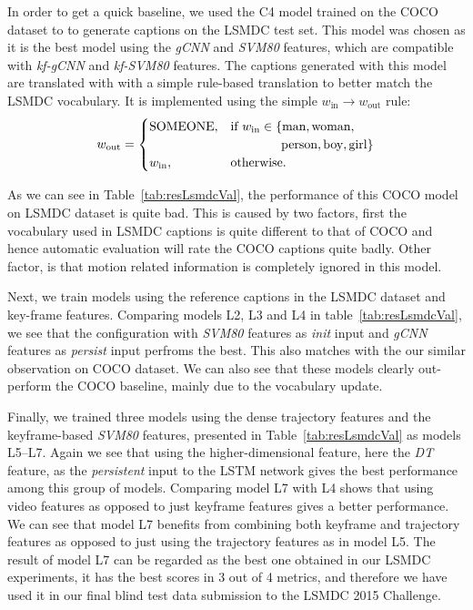 In order to get a quick baseline, we used the C4 model trained on the COCO
dataset to to generate captions on the LSMDC test set.
This model was chosen as it is the best model using the \emph{gCNN} and
\emph{SVM80} features, which are compatible with \emph{kf-gCNN} and
\emph{kf-SVM80} features.
The captions generated with this model are translated with with a simple
rule-based translation to better match the LSMDC vocabulary.
It is implemented using the simple%
$w_{\text{in}} \longrightarrow w_{\text{out}}$ rule:
\begin{align} \label{eqTrans} w_{\text{out}} = \begin{cases} \text{SOMEONE},&
\text{if } w_{\text{in}} \in \{\text{man}, \text{woman}, \\&
\text{\mbox{\qquad\qquad person}}, \text{boy}, \text{girl} \}\\ w_{\text{in}},&
\text{otherwise.} \end{cases} \end{align}

As we can see in Table~\ref{tab:resLsmdcVal}, the performance of this COCO model
on LSMDC dataset is quite bad.
This is caused by two factors, first the vocabulary used in LSMDC captions is
quite different to that of COCO and hence automatic evaluation will rate the
COCO captions quite badly.
Other factor, is that motion related information is completely ignored in this
model.

Next, we train models using the reference captions in the LSMDC dataset and
key-frame features.
Comparing models L2, L3 and L4 in table~\ref{tab:resLsmdcVal}, we see that the
configuration with \emph{SVM80} features as \emph{init} input and \emph{gCNN}
features as \emph{persist} input perfroms the best.
This also matches with the our similar observation on COCO dataset.
We can also see that these models clearly out-perform the COCO baseline, mainly
due to the vocabulary update.

Finally, we trained three models using the dense trajectory features and the
keyframe-based \emph{SVM80} features, presented in Table~\ref{tab:resLsmdcVal}
as models L5--L7. 
Again we see that using the higher-dimensional feature, here the \emph{DT}
feature, as the \emph{persistent} input to the LSTM network gives the best
performance among this group of models.
Comparing model L7 with L4 shows that using video features as opposed to just
keyframe features gives a better performance.
We can see that model L7 benefits from combining both keyframe and trajectory
features as opposed to just using the trajectory features as in model L5.
The result of model L7 can be regarded as the best one obtained in our LSMDC
experiments, it has the best scores in 3 out of 4 metrics, and therefore we have
used it in our final blind test data submission to the LSMDC 2015 Challenge.

